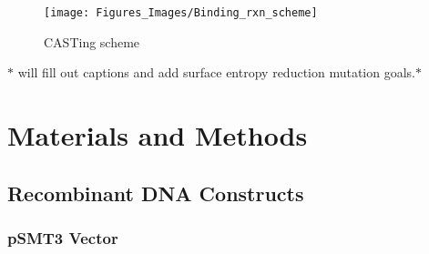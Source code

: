\documentclass[12pt,twoside]{reedthesis}
\begin{document}
		 	\begin{figure}[h]
		 		
		 		\centering
		 		\texttt{[image: Figures\_Images/Binding\_rxn\_scheme]}
		 		\caption[Binding Reaction and Immunoprecipitation Scheme ]{CASTing scheme}
		 		\label{CASTingScheme}
		 	\end{figure}
		 	
		 	$*$ will fill out captions and add surface entropy reduction mutation goals.$*$
		 

    \chapter*{Materials and Methods}
   \section*{Recombinant DNA Constructs}
   
   \subsection*{pSMT3 Vector}
   
\end{document}
